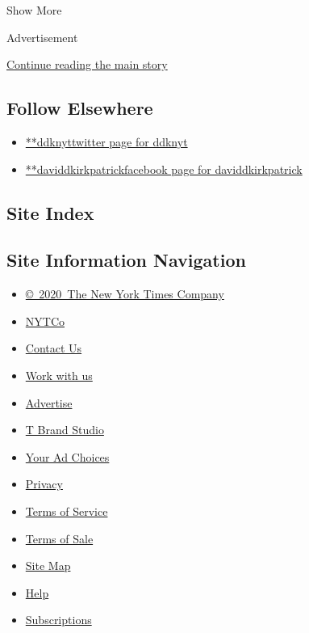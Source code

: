 Show More

Advertisement

\protect\hyperlink{after-mid2}{Continue reading the main story}

\hypertarget{follow-elsewhere}{%
\subsection{Follow Elsewhere}\label{follow-elsewhere}}

\begin{itemize}
\tightlist
\item
  \href{https://twitter.com/ddknyt}{**ddknyttwitter page for ddknyt}
\item
  \href{https://www.facebook.com/daviddkirkpatrick}{**daviddkirkpatrickfacebook
  page for daviddkirkpatrick}
\end{itemize}

\hypertarget{site-index}{%
\subsection{Site Index}\label{site-index}}

\hypertarget{site-information-navigation}{%
\subsection{Site Information
Navigation}\label{site-information-navigation}}

\begin{itemize}
\tightlist
\item
  \href{https://help.nytimes.com/hc/en-us/articles/115014792127-Copyright-notice}{©~2020~The
  New York Times Company}
\end{itemize}

\begin{itemize}
\tightlist
\item
  \href{https://www.nytco.com/}{NYTCo}
\item
  \href{https://help.nytimes.com/hc/en-us/articles/115015385887-Contact-Us}{Contact
  Us}
\item
  \href{https://www.nytco.com/careers/}{Work with us}
\item
  \href{https://nytmediakit.com/}{Advertise}
\item
  \href{http://www.tbrandstudio.com/}{T Brand Studio}
\item
  \href{https://www.nytimes.com/privacy/cookie-policy\#how-do-i-manage-trackers}{Your
  Ad Choices}
\item
  \href{https://www.nytimes.com/privacy}{Privacy}
\item
  \href{https://help.nytimes.com/hc/en-us/articles/115014893428-Terms-of-service}{Terms
  of Service}
\item
  \href{https://help.nytimes.com/hc/en-us/articles/115014893968-Terms-of-sale}{Terms
  of Sale}
\item
  \href{https://spiderbites.nytimes.com}{Site Map}
\item
  \href{https://help.nytimes.com/hc/en-us}{Help}
\item
  \href{https://www.nytimes.com/subscription?campaignId=37WXW}{Subscriptions}
\end{itemize}
